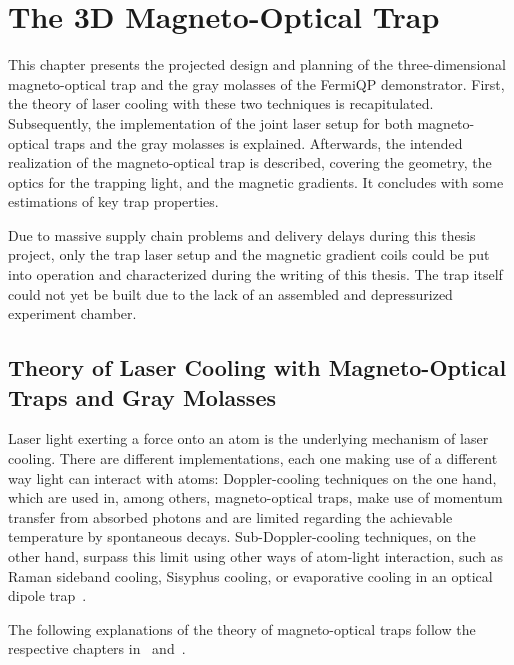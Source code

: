 \renewcommand{\imagepath}{../30-mot/img}

\chapter{The 3D Magneto-Optical Trap}\label{ch:mot}

This chapter presents the projected design and planning of the three-dimensional magneto-optical trap and the gray molasses of the FermiQP demonstrator. First, the theory of laser cooling with these two techniques is recapitulated. Subsequently, the implementation of the joint laser setup for both magneto-optical traps and the gray molasses is explained. Afterwards, the intended realization of the magneto-optical trap is described, covering the geometry, the optics for the trapping light, and the magnetic gradients. It concludes with some estimations of key trap properties.

Due to massive supply chain problems and delivery delays during this thesis project, only the trap laser setup and the magnetic gradient coils could be put into operation and characterized during the writing of this thesis. The trap itself could not yet be built due to the lack of an assembled and depressurized experiment chamber.

\section{Theory of Laser Cooling with Magneto-Optical Traps and Gray Molasses}\label{ch:mot_theory}
Laser light exerting a force onto an atom is the underlying mechanism of laser cooling. There are different implementations, each one making use of a different way light can interact with atoms: Doppler-cooling techniques on the one hand, which are used in, among others, magneto-optical traps, make use of momentum transfer from absorbed photons and are limited regarding the achievable temperature by spontaneous decays. Sub-Doppler-cooling techniques, on the other hand, surpass this limit using other ways of atom-light interaction, such as Raman sideband cooling, Sisyphus cooling, or evaporative cooling in an optical dipole trap~\cite{foot_atomic_2005}.

The following explanations of the theory of magneto-optical traps follow the respective chapters in~\cite{foot_atomic_2005} and~\cite{metcalf_laser_1999}.

